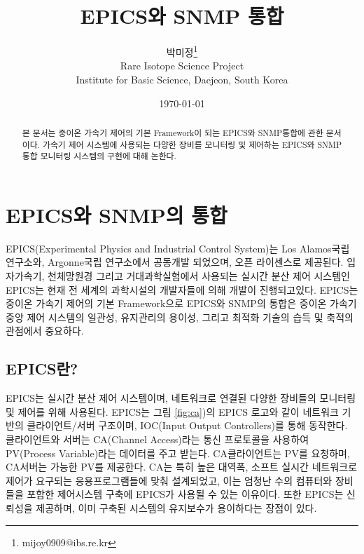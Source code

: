 \documentclass[11pt
  , a4paper
  , article
  , oneside
]{memoir}
\begin{document}
\newcommand{\technumber}{
  RAON Control-Document Series\\
  Revision : v0.1,   Release : Mar. 12. 2015}
\title{\textbf{EPICS와 SNMP 통합}}

\author{박미정\thanks{mijoy0909@ibs.re.kr} \\

  Rare Isotope Science Project\\
  Institute for Basic Science, Daejeon, South Korea
}
\date{\today}

\renewcommand{\maketitlehooka}{\begin{flushright}\textsf{\technumber}\end{flushright}}

\maketitle

\begin{abstract}
본 문서는 중이온 가속기 제어의 기본 Framework이 되는 EPICS와 SNMP통합에 관한 문서이다. 가속기 제어 시스템에 사용되는 다양한 장비를 모니터링 및 제어하는 EPICS와 SNMP 통합 모니터링 시스템의 구현에 대해 논한다.
\end{abstract}

\chapter{EPICS와 SNMP의 통합}
EPICS(Experimental Physics and Industrial Control System)는 Los Alamos국립 연구소와, Argonne국립 연구소에서 공동개발 되었으며, 오픈 라이센스로 제공된다. 입자가속기, 천체망원경 그리고 거대과학실험에서 사용되는 실시간 분산 제어 시스템인 EPICS는 현재 전 세계의 과학시설의 개발자들에 의해 개발이 진행되고있다. EPICS는 중이온 가속기 제어의 기본 Framework으로 EPICS와 SNMP의 통합은 중이온 가속기 중앙 제어 시스템의 일관성, 유지관리의 용이성, 그리고 최적화 기술의 습득 및 축적의 관점에서 중요하다. 

\section{EPICS란?}
EPICS는 실시간 분산 제어 시스템이며, 네트워크로 연결된 다양한 장비들의 모니터링 및 제어를 위해 사용된다. EPICS는 그림 \ref{fig:ca})의 EPICS 로고와 같이 네트워크 기반의 클라이언트/서버 구조이며, IOC(Input Output Controllers)를 통해 동작한다. 클라이언트와 서버는 CA(Channel Access)라는 통신 프로토콜을 사용하여 PV(Process Variable)라는 데이터를 주고 받는다. CA클라이언트는 PV를 요청하며, CA서버는 가능한 PV를 제공한다.  CA는 특히 높은 대역폭, 소프트 실시간 네트워크로 제어가 요구되는 응용프로그램들에 맞춰 설계되었고, 이는 엄청난 수의 컴퓨터와 장비들을 포함한 제어시스템 구축에 EPICS가 사용될 수 있는 이유이다. 또한 EPICS는 신뢰성을 제공하며, 이미 구축된 시스템의 유지보수가 용이하다는 장점이 있다. 
\end{document}
